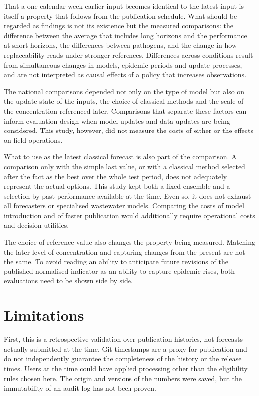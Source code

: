 \documentclass[11pt]{article}
\begin{document}
That a one-calendar-week-earlier input becomes identical to the latest input is itself a property that follows from the publication schedule. What should be regarded as findings is not its existence but the measured comparisons: the difference between the average that includes long horizons and the performance at short horizons, the differences between pathogens, and the change in how replaceability reads under stronger references. Differences across conditions result from simultaneous changes in models, epidemic periods and update processes, and are not interpreted as causal effects of a policy that increases observations.

The national comparisons depended not only on the type of model but also on the update state of the inputs, the choice of classical methods and the scale of the concentration referenced later. Comparisons that separate these factors can inform evaluation design when model updates and data updates are being considered. This study, however, did not measure the costs of either or the effects on field operations.

What to use as the latest classical forecast is also part of the comparison. A comparison only with the simple last value, or with a classical method selected after the fact as the best over the whole test period, does not adequately represent the actual options. This study kept both a fixed ensemble and a selection by past performance available at the time. Even so, it does not exhaust all forecasters or specialised wastewater models. Comparing the costs of model introduction and of faster publication would additionally require operational costs and decision utilities.

The choice of reference value also changes the property being measured. Matching the later level of concentration and capturing changes from the present are not the same. To avoid reading an ability to anticipate future revisions of the published normalised indicator as an ability to capture epidemic rises, both evaluations need to be shown side by side.

\section{Limitations}\label{sec:limitations}

First, this is a retrospective validation over publication histories, not forecasts actually submitted at the time. Git timestamps are a proxy for publication and do not independently guarantee the completeness of the history or the release times. Users at the time could have applied processing other than the eligibility rules chosen here. The origin and versions of the numbers were saved, but the immutability of an audit log has not been proven.
\end{document}
